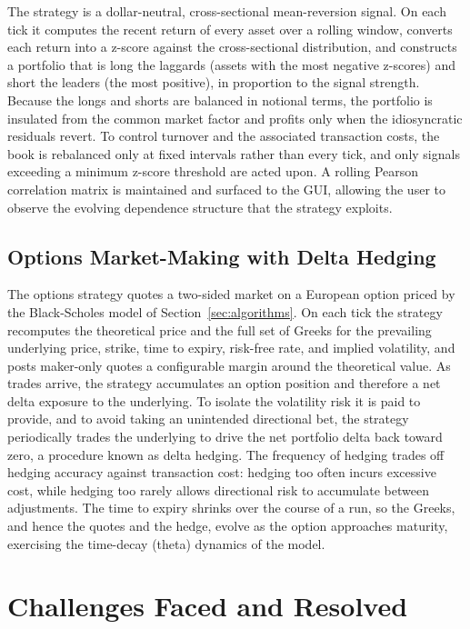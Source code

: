 \documentclass[12pt,oneside,a4paper]{report}
\begin{document}
The strategy is a dollar-neutral, cross-sectional mean-reversion signal. On each tick it computes the recent return of every asset over a rolling window, converts each return into a z-score against the cross-sectional distribution, and constructs a portfolio that is long the laggards (assets with the most negative z-scores) and short the leaders (the most positive), in proportion to the signal strength. Because the longs and shorts are balanced in notional terms, the portfolio is insulated from the common market factor and profits only when the idiosyncratic residuals revert. To control turnover and the associated transaction costs, the book is rebalanced only at fixed intervals rather than every tick, and only signals exceeding a minimum z-score threshold are acted upon. A rolling Pearson correlation matrix is maintained and surfaced to the GUI, allowing the user to observe the evolving dependence structure that the strategy exploits.

\subsection{Options Market-Making with Delta Hedging}

The options strategy quotes a two-sided market on a European option priced by the Black-Scholes model of Section~\ref{sec:algorithms}. On each tick the strategy recomputes the theoretical price and the full set of Greeks for the prevailing underlying price, strike, time to expiry, risk-free rate, and implied volatility, and posts maker-only quotes a configurable margin around the theoretical value. As trades arrive, the strategy accumulates an option position and therefore a net delta exposure to the underlying. To isolate the volatility risk it is paid to provide, and to avoid taking an unintended directional bet, the strategy periodically trades the underlying to drive the net portfolio delta back toward zero, a procedure known as delta hedging. The frequency of hedging trades off hedging accuracy against transaction cost: hedging too often incurs excessive cost, while hedging too rarely allows directional risk to accumulate between adjustments. The time to expiry shrinks over the course of a run, so the Greeks, and hence the quotes and the hedge, evolve as the option approaches maturity, exercising the time-decay (theta) dynamics of the model.

\section{Challenges Faced and Resolved}
\label{sec:challenges}
\end{document}
